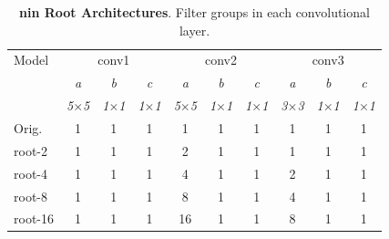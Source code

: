 \documentclass[thesis]{subfiles}
\begin{document}
	\begin{table}[tbp]
		\caption[\Gls{nin} root architectures]{\textbf{\Gls{nin} Root Architectures}. Filter groups in each convolutional layer.}
		\label{table:ninconfig}
		\centering
		\begin{tabular}{@{}lccccccccc@{}}
			\toprule
			Model & \multicolumn{3}{c}{conv1} & \multicolumn{3}{c}{conv2} & \multicolumn{3}{c}{conv3} \\
			& \textit{\footnotesize a} & \textit{\footnotesize b} & \textit{\footnotesize c} & \textit{\footnotesize a} & \textit{\footnotesize b} & \textit{\footnotesize c} & \textit{\footnotesize a} & \textit{\footnotesize b} & \textit{\footnotesize c} \\
			& \textit{\footnotesize5$\times$5} & \textit{\footnotesize1$\times$1} & \textit{\footnotesize1$\times$1} & \textit{\footnotesize5$\times$5} & \textit{\footnotesize1$\times$1} & \textit{\footnotesize1$\times$1} & \textit{\footnotesize3$\times$3} & \textit{\footnotesize1$\times$1} & \textit{\footnotesize1$\times$1} \\
			Orig. & 1 & 1 & 1 & 1 & 1 & 1 & 1 & 1 & 1\\
			\midrule
			root-2 & 1 & 1 & 1 & 2 & 1 & 1 & 1 & 1 & 1\\
			root-4 & 1 & 1 & 1 & 4 & 1 & 1 & 2 & 1 & 1\\
			root-8 & 1 & 1 & 1 & 8 & 1 & 1 & 4 & 1 & 1\\
			root-16 & 1 & 1 & 1 & 16 & 1 & 1 & 8 & 1 & 1\\
			\bottomrule
		\end{tabular}
	\end{table}
\end{document}
